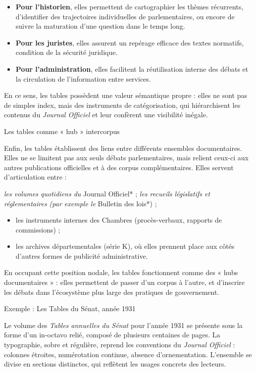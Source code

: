 \begin{itemize}
\item \textbf{Pour l’historien}, elles permettent de cartographier les thèmes récurrents, d’identifier des trajectoires individuelles de parlementaires, ou encore de suivre la maturation d’une question dans le temps long.
\item \textbf{Pour les juristes}, elles assurent un repérage efficace des textes normatifs, condition de la sécurité juridique.
\item \textbf{Pour l’administration}, elles facilitent la réutilisation interne des débats et la circulation de l’information entre services.

\end{itemize}
En ce sens, les tables possèdent une valeur sémantique propre : elles ne sont pas de simples index, mais des instruments de catégorisation, qui hiérarchisent les contenus du \emph{Journal Officiel} et leur confèrent une visibilité inégale.

Les tables comme « hub » intercorpus

Enfin, les tables établissent des liens entre différents ensembles documentaires. Elles ne se limitent pas aux seuls débats parlementaires, mais relient ceux-ci aux autres publications officielles et à des corpus complémentaires. Elles servent d’articulation entre :

\emph{ les volumes quotidiens du }Journal Officiel* ;
\emph{ les recueils législatifs et réglementaires (par exemple le }Bulletin des lois*) ;
\begin{itemize}
\item les instruments internes des Chambres (procès-verbaux, rapports de commissions) ;
\item les archives départementales (série K), où elles prennent place aux côtés d’autres formes de publicité administrative.

\end{itemize}
En occupant cette position nodale, les tables fonctionnent comme des « hubs documentaires » : elles permettent de passer d’un corpus à l’autre, et d’inscrire les débats dans l’écosystème plus large des pratiques de gouvernement.

Exemple : Les Tables du Sénat, année 1931

Le volume des \emph{Tables annuelles du Sénat} pour l’année 1931 se présente sous la forme d’un in-octavo relié, composé de plusieurs centaines de pages. La typographie, sobre et régulière, reprend les conventions du \emph{Journal Officiel} : colonnes étroites, numérotation continue, absence d’ornementation. L’ensemble se divise en sections distinctes, qui reflètent les usages concrets des lecteurs.

